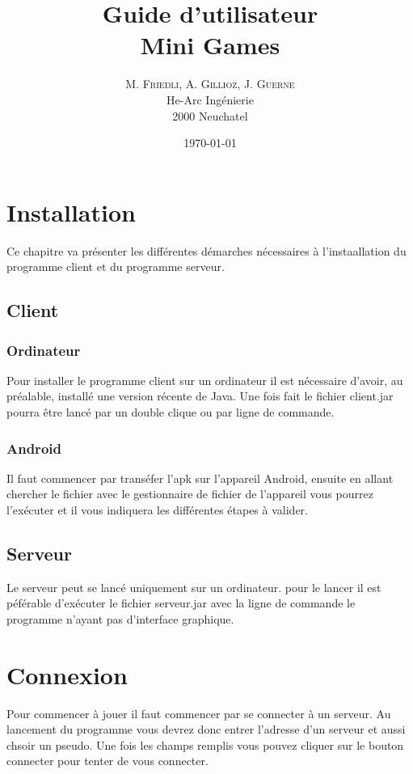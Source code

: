 \documentclass{report}
\title{\Huge Guide d'utilisateur \\ \huge Mini Games }
\author{M. \textsc{Friedli}, A. \textsc{Gillioz}, J. \textsc{Guerne}\\
He-Arc Ingénierie\\
2000 Neuchatel}
\date{\today{}}
\begin{document}
\maketitle

\chapter{Installation}
Ce chapitre va présenter les différentes démarches nécessaires à l'instaallation du
programme client et du programme serveur.
\section{Client}

\subsection{Ordinateur}
Pour installer le programme client sur un ordinateur il est nécessaire d'avoir, au préalable, installé une version récente de Java.
Une fois fait le fichier client.jar pourra être lancé par un double clique ou par ligne de commande.

\subsection{Android}
Il faut commencer par transéfer l'apk sur l'appareil Android, ensuite en allant chercher le fichier avec le gestionnaire de fichier de
l'appareil vous pourrez l'exécuter et il vous indiquera les différentes étapes à valider.

\section{Serveur}
Le serveur peut se lancé uniquement sur un ordinateur. pour le lancer il est péférable d'exécuter le fichier serveur.jar avec la ligne de commande le programme n'ayant
pas d'interface graphique.


\chapter{Connexion}
Pour commencer à jouer il faut commencer par se connecter à un serveur.
Au lancement du programme vous devrez donc entrer l'adresse d'un serveur et aussi chsoir un pseudo. Une fois les champs remplis vous pouvez cliquer sur le bouton connecter pour tenter de vous connecter.
\end{document}
